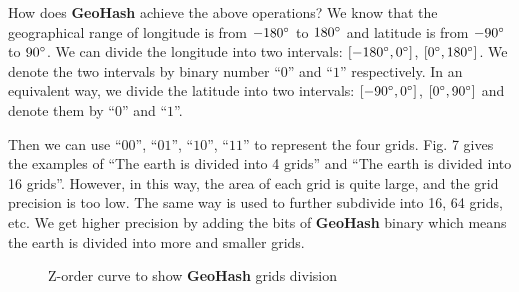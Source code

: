 \documentclass[conference]{IEEEtran}
\begin{document}
How does \textbf{GeoHash} achieve the above operations?
We know that the geographical range of longitude is from $-180\degree$ to $180\degree$ and latitude is from $-90\degree$ to $90\degree$\cite{crossley1999guide}.
We can divide the longitude into two intervals: $[-180\degree, 0\degree]$, $[0\degree, 180\degree]$.
We denote the two intervals by binary number ``$0$'' and ``$1$'' respectively.
In an equivalent way, we divide the latitude into two intervals: $[-90\degree, 0\degree]$, $[0\degree, 90\degree]$ and denote them by ``$0$'' and ``$1$''.

Then we can use ``$00$'', ``$01$'', ``$10$'', ``$11$'' to represent the four grids.
Fig. 7 gives the examples of ``The earth is divided into 4 grids'' and ``The earth is divided into 16 grids''.
However, in this way, the area of each grid is quite large, and the grid precision is too low.
The same way is used to further subdivide into 16, 64 grids, etc.
We get higher precision by adding the bits of \textbf{GeoHash} binary which means the earth is divided into more and smaller grids.
\begin{figure}[h]
    \centerline{
    }
    \caption{Z-order curve to show \textbf{GeoHash} grids division}
\end{figure}
\end{document}
